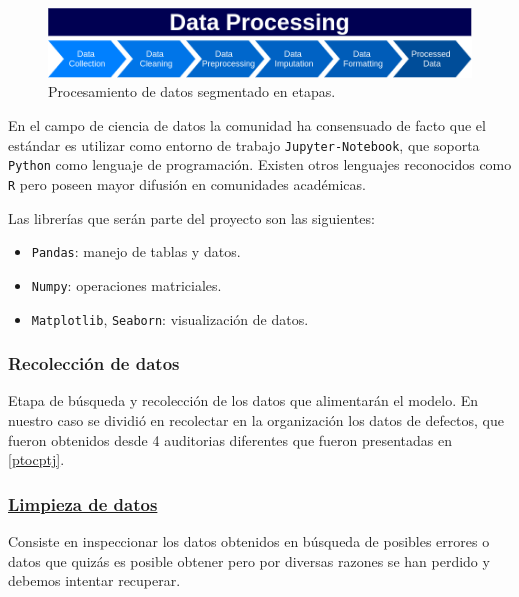 \documentclass[a4paper,12pt]{article}
\begin{document}
		\begin{figure}[H]
			\begin{center}				
				\includegraphics[width=1\textwidth]{dataproc.png}
				\caption{Procesamiento de datos segmentado en etapas.}
				\label{fig:dataproc}
			\end{center}
		\end{figure}
				
		En el campo de ciencia de datos la comunidad ha consensuado de facto que el estándar es utilizar como entorno de trabajo \texttt{Jupyter-Notebook}, que soporta \texttt{Python} como lenguaje de programación. Existen otros lenguajes reconocidos como \texttt{R} pero poseen mayor difusión en comunidades académicas.
				
		Las librerías que serán parte del proyecto son las siguientes: 
		\begin{itemize}[noitemsep, topsep=2pt]
			\item \texttt{Pandas}: manejo de tablas y datos.
			\item \texttt{Numpy}: operaciones matriciales.
			\item \texttt{Matplotlib}, \texttt{Seaborn}: visualización de datos.
		\end{itemize}
				
		\subsubsection{Recolección de datos}
				
		Etapa de búsqueda y recolección de los datos que alimentarán el modelo. En nuestro caso se dividió en recolectar en la organización los datos de defectos, que fueron obtenidos desde 4 auditorias diferentes que fueron presentadas en \ref{ptocptj}.
				
		\subsubsection{\href{https://github.com/GeraCollante/tesis-icomp-machinelearning/blob/main/DataCleaning.ipynb}{\color{blue}Limpieza de datos}} \label{DataCleaning}
		Consiste en inspeccionar los datos obtenidos en búsqueda de posibles errores o datos que quizás es posible obtener pero por diversas razones se han perdido y debemos intentar recuperar.
				
\end{document}
